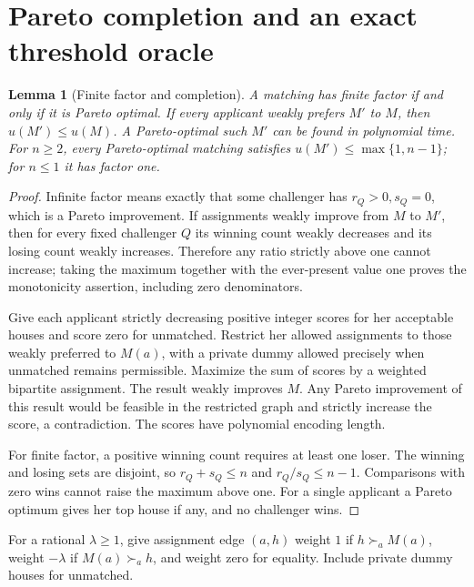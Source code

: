 \documentclass[11pt]{article}
\newtheorem{lemma}[theorem]{Lemma}
\theoremstyle{remark}
\begin{document}
\section{Pareto completion and an exact threshold oracle}
\begin{lemma}[Finite factor and completion]\label{pareto}
A matching has finite factor if and only if it is Pareto optimal.
If every applicant weakly prefers $M'$ to $M$, then
$u(M')\leq u(M)$. A Pareto-optimal such $M'$ can be found in polynomial
time. For $n\geq2$, every Pareto-optimal matching satisfies
$u(M')\leq\max\{1,n-1\}$; for $n\leq1$ it has factor one.
\end{lemma}
\begin{proof}
Infinite factor means exactly that some challenger has $r_Q>0,s_Q=0$,
which is a Pareto improvement. If assignments weakly improve from $M$
to $M'$, then for every fixed challenger $Q$ its winning count weakly
decreases and its losing count weakly increases. Therefore any ratio
strictly above one cannot increase; taking the maximum together with
the ever-present value one proves the monotonicity assertion, including
zero denominators.

Give each applicant strictly decreasing positive integer scores for
her acceptable houses and score zero for unmatched. Restrict her
allowed assignments to those weakly preferred to $M(a)$, with a private
dummy allowed precisely when unmatched remains permissible. Maximize
the sum of scores by a weighted bipartite assignment. The result weakly
improves $M$. Any Pareto improvement of this result would be feasible
in the restricted graph and strictly increase the score, a
contradiction. The scores have polynomial encoding length.

For finite factor, a positive winning count requires at least one loser.
The winning and losing sets are disjoint, so $r_Q+s_Q\leq n$ and
$r_Q/s_Q\leq n-1$. Comparisons with zero wins cannot raise the maximum
above one. For a single applicant a Pareto optimum gives her top house
if any, and no challenger wins.
\end{proof}

For a rational $\lambda\geq1$, give assignment edge $(a,h)$ weight $1$
if $h\succ_a M(a)$, weight $-\lambda$ if $M(a)\succ_a h$, and weight
zero for equality. Include private dummy houses for unmatched.
\end{document}
